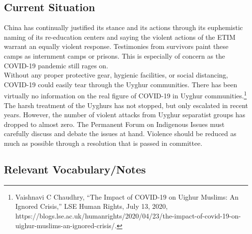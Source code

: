 \documentclass[10pt, letterpaper]{article}
\begin{document}
\subsection{Current Situation}

China has continually justified its stance and its actions through its
euphemistic naming of its re-education centers and saying the violent
actions of the ETIM warrant an equally violent response. Testimonies
from survivors paint these camps as internment camps or prisons. This is
especially of concern as the COVID-19 pandemic still rages on. \\

Without any proper protective gear, hygienic facilities, or social
distancing, COVID-19 could easily tear through the Uyghur communities.
There has been virtually no information on the real figure of COVID-19
in Uyghur communities.\footnote{Vaishnavi C Chaudhry, ``The Impact of
  COVID-19 on Uighur Muslims: An Ignored Crisis,'' LSE Human Rights,
  July 13, 2020,
  https://blogs.lse.ac.uk/humanrights/2020/04/23/the-impact-of-covid-19-on-uighur-muslims-an-ignored-crisis/.} \\

The harsh treatment of the Uyghurs has not stopped, but only escalated
in recent years. However, the number of violent attacks from Uyghur
separatist groups has dropped to almost zero. The Permanent Forum on
Indigenous Issues must carefully discuss and debate the issues at hand.
Violence should be reduced as much as possible through a resolution that
is passed in committee. \\

\subsection{Relevant Vocabulary/Notes}
\end{document}
